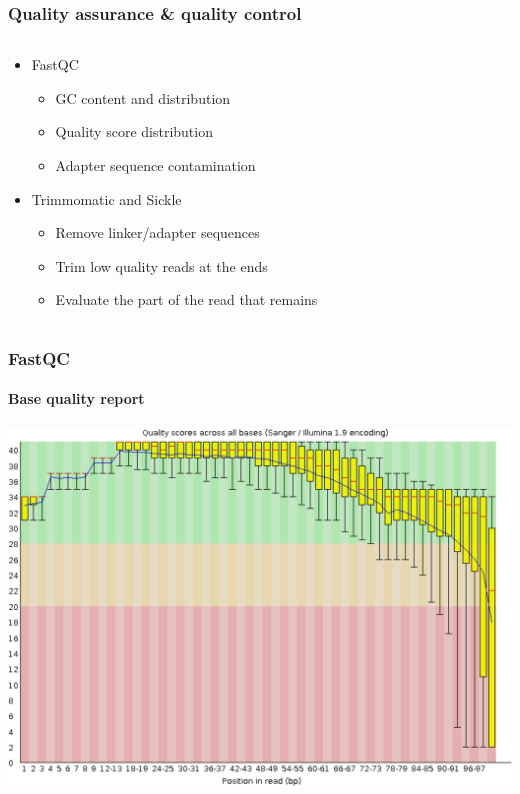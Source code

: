 \documentclass{beamer}			  %
\begin{document}
\begin{frame}
\frametitle{Quality assurance \& quality control}
  \begin{columns}[T]
	\begin{column}{.72\textwidth}
	\begin{itemize}
		\item FastQC
		\begin{itemize}
			\item GC content and distribution
			\item Quality score distribution
			\item Adapter sequence contamination
		\end{itemize}
		\item Trimmomatic and Sickle
		\begin{itemize}
			\item Remove linker/adapter sequences
			\item Trim low quality reads at the ends
			\item Evaluate the part of the read that remains
		\end{itemize}
	\end{itemize}
	\end{column}
	\begin{column}{.28\textwidth}
	\end{column}
  \end{columns}
\end{frame}

\begin{frame}
\frametitle{FastQC}
\framesubtitle{Base quality report}
	\begin{center}
		\includegraphics[height=0.75\textheight]{figures/dge_03cp.png}
	\end{center}
\end{frame}
\end{document}
